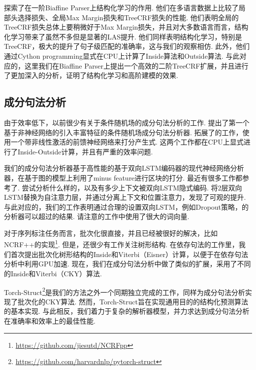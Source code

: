 \citet{zhang-etal-2019-empirical}探索了在一阶Biaffine Parser上结构化学习的作用.
他们在多语言数据上比较了局部头选择损失、全局Max Margin损失和TreeCRF损失的性能.
他们表明全局的TreeCRF损失总体上要稍微好于Max Margin损失，并且对大多数语言而言，结构化学习带来了虽然不多但是显著的LAS提升.
他们同样表明结构化学习，特别是TreeCRF，极大的提升了句子级匹配的准确率，这与我们的观察相仿.
此外，他们通过Cython programming显式在CPU上计算了Inside算法和Outside算法.
与此对应的，这里我们在Biaffine Parser上提出一个高效的二阶TreeCRF扩展，并且进行了更加深入的分析，证明了结构化学习和高阶建模的效果.

\subsection{成分句法分析}

由于效率低下，以前很少有关于条件随机场的成分句法分析的工作.
\citet{finkel-etal-2008-efficient}提出了第一个基于非神经网络的引入丰富特征的条件随机场成分句法分析器.
\citet{durrett-klein-2015-neural}拓展了\citet{finkel-etal-2008-efficient}的工作，使用一个带非线性激活的前馈神经网络来打分产生式.
这两个工作都在CPU上显式进行了Inside-Outside计算，并且有严重的效率问题.

我们的成分句法分析器基于高性能的基于双向LSTM编码器\citep{stern-etal-2017-minimal}的现代神经网络分析器，在基于图的模型上利用了minus feature\citep{cross-huang-2016-span}进行区块的打分.
最近有很多工作都参考了\citet{stern-etal-2017-minimal}.
\citet{gaddy-etal-2018-whats}尝试分析什么样的，以及有多少上下文被双向LSTM隐式编码.
\citet{kitaev-klein-2018-constituency}将2层双向LSTM替换为自注意力层，并通过分离上下文和位置注意力，发现了可观的提升.
与此对应的，我们的工作表明通过合理的设置双向LSTM，例如Dropout策略，\citet{stern-etal-2017-minimal}的分析器可以超过\citet{kitaev-klein-2018-constituency}的结果.
请注意\citet{kitaev-klein-2018-constituency}的工作中使用了很大的词向量.

对于序列标注任务而言，批次化很直接，并且已经被很好的解决，比如NCRF++的实现\footnote{\url{https://github.com/jiesutd/NCRFpp}}.
但是，还很少有工作关注树形结构.
在依存句法的工作里，我们首次提出批次化树形结构的Inside和Viterbi（Eisner）计算，以便于在依存句法分析中利用GPU加速\citep{zhang-etal-2020-efficient}.
现在，我们在成分句法分析中做了类似的扩展，采用了不同的Inside和Viterbi（CKY）算法.

Torch-Struct\footnote{\url{https://github.com/harvardnlp/pytorch-struct}}\citep{rush-2020-torch}是我们的方法之外一个同期独立完成的工作，同样为成分句法分析实现了批次化的CKY算法.
然而，Torch-Struct旨在实现通用目的的结构化预测算法的基本实现.
与此相反，我们着力于复杂的解析器模型，并力求达到成分句法分析在准确率和效率上的最佳性能.

